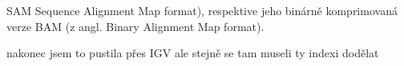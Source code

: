 \documentclass[czech,DP]{thesiskiv}
\begin{document}
SAM Sequence Alignment Map format), respektive jeho binárně
komprimovaná verze BAM (z angl. Binary Alignment Map format).

nakonec jsem to pustila přes IGV ale stejně se tam museli ty indexi dodělat


% 
%
\nocite{*}

{\raggedright\small

}
\end{document}
